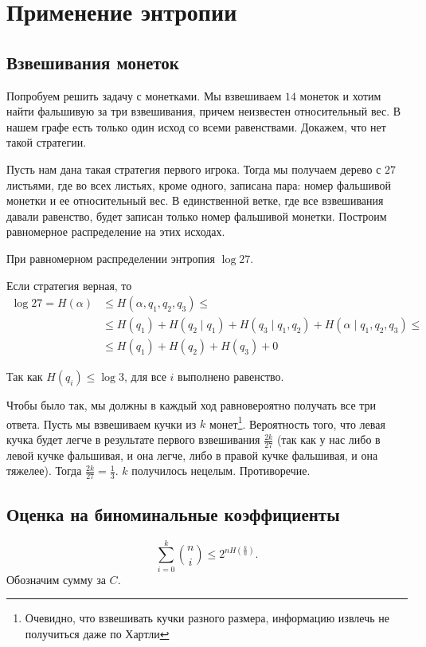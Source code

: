 \section{Применение энтропии}
\subsection{Взвешивания монеток}
Попробуем решить задачу с монетками. Мы взвешиваем $ 14$ монеток и хотим найти фальшивую за три взвешивания, причем неизвестен относительный вес. В нашем графе есть только один исход со всеми равенствами. Докажем, что нет такой стратегии.

Пусть нам дана такая стратегия первого игрока.
Тогда мы получаем дерево с $ 27$ листьями, где во всех листьях, кроме одного, записана пара:
номер фальшивой монетки и ее относительный вес.
В единственной ветке, где все взвешивания давали равенство, будет записан только номер фальшивой монетки.
Построим равномерное распределение на этих исходах.

При равномерном распределении энтропия $ \log 27$.

Если стратегия верная, то
\begin{align*}
\log 27 = H(\alpha) &\le  H( \alpha, q_1, q_2, q_3) \le \\ &\le H( q_1 ) + H(q_{2} \mid q_1 )+ H(q_3 \mid q_1, q_2)+ H( \alpha  \mid q_1, q_2, q_3 ) \le \tag{Chain rule}\\  
			& \le  H(q_1) + H(q_2) + H(q_3) + 0
\end{align*}

Так как $ H(q_i) \le  \log 3$, для все $ i$ выполнено равенство.

Чтобы было так, мы должны в каждый ход равновероятно получать все три ответа.
Пусть мы взвешиваем кучки из $ k$ монет\footnote{Очевидно, что взвешивать кучки разного размера, информацию извлечь не получиться даже по Хартли}. 
Вероятность того, что левая кучка будет легче в результате первого взвешивания $\frac{2k}{27}$ (так как у нас либо в левой кучке фальшивая, и она легче, либо в правой кучке фальшивая, и она тяжелее). Тогда $\frac{2k}{27} = \frac{1}{3}$. $k$ получилось нецелым.
Противоречие.

\subsection{Оценка на биноминальные коэффициенты}
\[
	\sum_{i=0}^{k} {n \choose i} \le  2^{n H(\frac{k}{n})}
.\] 
Обозначим сумму за $ C$.

